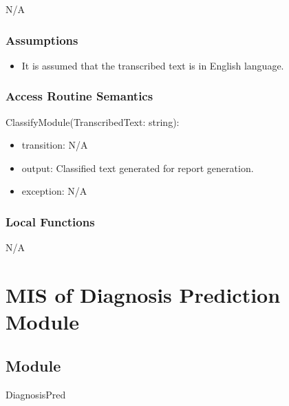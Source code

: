 \documentclass[12pt, titlepage]{article}
\begin{document}
N/A

\subsubsection{Assumptions}

\begin{itemize}
  \item It is assumed that the transcribed text is in English language.
\end{itemize}

\subsubsection{Access Routine Semantics}

\noindent ClassifyModule(TranscribedText: string):
\begin{itemize}
\item transition: N/A
\item output: Classified text generated for report generation. 
\item exception: N/A  
\end{itemize}

\subsubsection{Local Functions}

N/A

\newpage

\section{MIS of Diagnosis Prediction Module} \label{diag_pred_mod}

\subsection{Module}

DiagnosisPred
\end{document}

